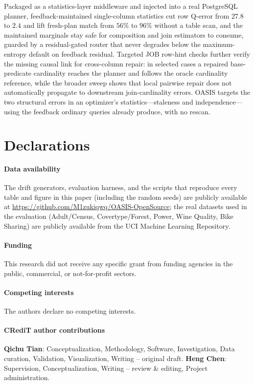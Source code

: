 \documentclass[preprint,12pt]{elsarticle}
\begin{document}
Packaged as a statistics-layer middleware and injected into a real PostgreSQL planner,
feedback-maintained single-column statistics cut row Q-error from $27.8$ to $2.4$ and lift
fresh-plan match from $56\%$ to $96\%$ without a table scan, and the maintained marginals
stay safe for composition and join estimators to consume, guarded by a residual-gated router
that never degrades below the maximum-entropy default on feedback residual. Targeted JOB
row-hint checks further verify the missing causal link for cross-column repair: in selected
cases a repaired base-predicate cardinality reaches the planner and follows the oracle
cardinality reference, while the broader sweep shows that local pairwise repair does not
automatically propagate to downstream join-cardinality errors. OASIS targets the two structural errors in an optimizer's statistics---staleness and
independence---using the feedback ordinary queries already produce, with no rescan.

\section*{Declarations}

\paragraph{Data availability}
The drift generators, evaluation harness, and the scripts that reproduce every table and
figure in this paper (including the random seeds) are publicly available at
\url{https://github.com/M1zukiqwq/OASIS-OpenSource}; the real datasets used in the evaluation
(Adult/Census, Covertype/Forest, Power, Wine Quality, Bike Sharing) are publicly available
from the UCI Machine Learning Repository.

\paragraph{Funding}
This research did not receive any specific grant from funding agencies in the public,
commercial, or not-for-profit sectors.

\paragraph{Competing interests}
The authors declare no competing interests.

\paragraph{CRediT author contributions}
\textbf{Qichu Tian}: Conceptualization, Methodology, Software, Investigation, Data
curation, Validation, Visualization, Writing -- original draft. \textbf{Heng Chen}:
Supervision, Conceptualization, Writing -- review \& editing, Project administration.
\end{document}
